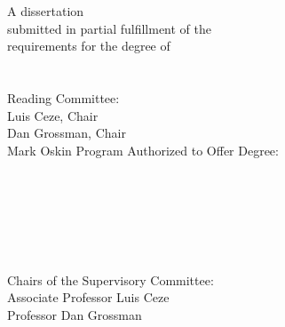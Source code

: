 \documentclass[ twoside,openright,titlepage,numbers=noenddot,headinclude,
                footinclude=true,cleardoublepage=empty,abstractoff,%
                BCOR=5mm,paper=letter,fontsize=11pt,letterpaper,%
                american,%
                ]{scrreprt}
\begin{document}
\raggedbottom
\renewcommand*{\bibname}{References}
\pagestyle{plain}


\begin{titlepage}
	\begin{addmargin}[-1cm]{-3cm}
    \begin{center}
        \large
        \hfill
        \vfill
        \begingroup
            \color{Violet} \\
            \color{Violet} \\ \bigskip
        \endgroup
        \vfill
        A dissertation \\
        submitted in partial fulfillment of the \\
        requirements for the degree of \\
        \medskip
         \\
        \bigskip
         \\
        \smallskip
        \vfill
        Reading Committee: \\
        \smallskip
        Luis Ceze, Chair \\
        \smallskip
        Dan Grossman, Chair \\
        \smallskip
        Mark Oskin
        \vfill
        Program Authorized to Offer Degree: \\
        \smallskip
    \end{center}
  \end{addmargin}
\end{titlepage}


\cleardoublepage
\thispagestyle{empty}
\begin{center}
    \vspace*{20ex}
    \textcopyright\  \\
    \bigskip
\end{center}


\cleardoublepage
\thispagestyle{empty}

\begin{center}
     \\
    \bigskip
    {\color{Violet}
     \\
     \\
    }
    \bigskip
     \\
    \bigskip
    Chairs of the Supervisory Committee: \\
    Associate Professor Luis Ceze \\
    Professor Dan Grossman \\
     \\
    \bigskip
\end{center}
\end{document}
